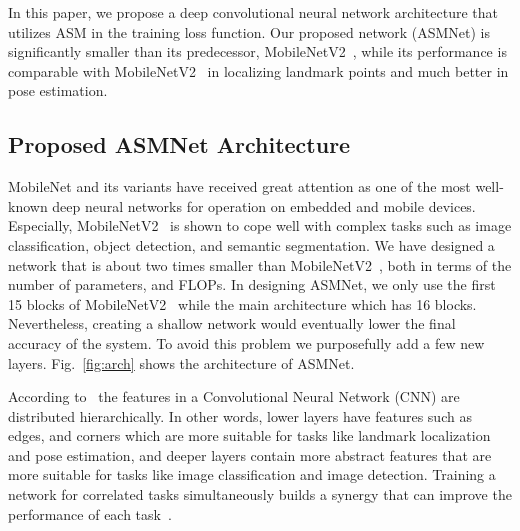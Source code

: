 \documentclass[final]{cvpr}
\begin{document}
In this paper, we propose a deep convolutional neural network architecture that utilizes ASM in the training loss function. Our proposed network (ASMNet) is significantly smaller than its predecessor, MobileNetV2~\cite{sandler2018mobilenetv2}, while its performance is comparable with MobileNetV2~\cite{sandler2018mobilenetv2} in localizing landmark points and much better in pose estimation.

\subsection{Proposed ASMNet Architecture} \label{sec:deepasmArch}
MobileNet and its variants \cite{sandler2018mobilenetv2} have received great attention as one of the most well-known deep neural networks for operation on embedded and mobile devices. Especially, MobileNetV2~\cite{sandler2018mobilenetv2} is shown to cope well with complex tasks such as image classification, object detection, and semantic segmentation. We have designed a network that is about two times smaller than MobileNetV2~\cite{sandler2018mobilenetv2}, both in terms of the number of parameters, and FLOPs. In designing ASMNet, we only use the first 15 blocks of MobileNetV2~\cite{sandler2018mobilenetv2} while the main architecture which has 16 blocks. Nevertheless, creating a shallow network would eventually lower the final accuracy of the system. To avoid this problem we purposefully add a few new layers. Fig.~\ref{fig:arch} shows the architecture of ASMNet.

According to~\cite{zeiler2014visualizing} the features in a Convolutional Neural Network (CNN) are distributed hierarchically. In other words, lower layers have features such as edges, and corners which are more suitable for tasks like landmark localization and pose estimation, and deeper layers contain more abstract features that are more suitable for tasks like image classification and image detection. Training a network for correlated tasks simultaneously builds a synergy that can improve the performance of each task~\cite{chen2014joint, zhang2014facial}.
\end{document}
